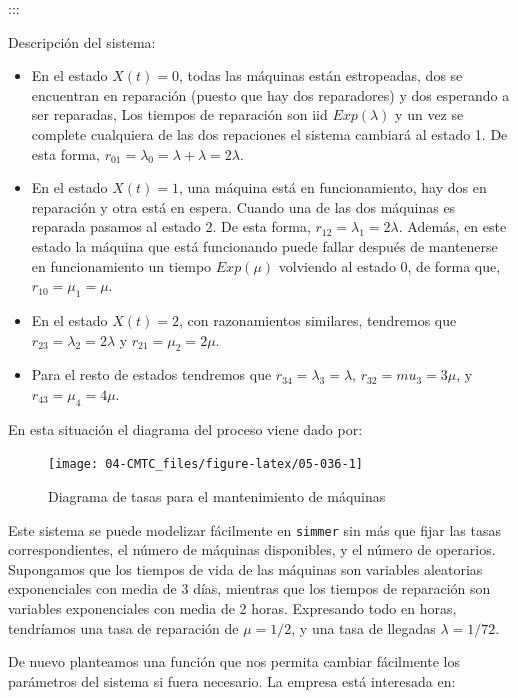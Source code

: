 \documentclass[
]{book}
\theoremstyle{definition}
\theoremstyle{definition}
\theoremstyle{definition}
\theoremstyle{definition}
\theoremstyle{remark}
\begin{document}
:::

Descripción del sistema:

\begin{itemize}
\item
  En el estado \(X(t)=0\), todas las máquinas están estropeadas, dos se encuentran en reparación (puesto que hay dos reparadores) y dos esperando a ser reparadas, Los tiempos de reparación son iid \(Exp(\lambda)\) y un vez se complete cualquiera de las dos repaciones el sistema cambiará al estado 1. De esta forma, \(r_{01} = \lambda_0 = \lambda + \lambda = 2\lambda\).
\item
  En el estado \(X(t)=1\), una máquina está en funcionamiento, hay dos en reparación y otra está en espera. Cuando una de las dos máquinas es reparada pasamos al estado 2. De esta forma, \(r_{12} = \lambda_1 = 2\lambda\). Además, en este estado la máquina que está funcionando puede fallar después de mantenerse en funcionamiento un tiempo \(Exp(\mu)\) volviendo al estado 0, de forma que, \(r_{10} = \mu_1 = \mu\).
\item
  En el estado \(X(t)=2\), con razonamientos similares, tendremos que \(r_{23} = \lambda_2 = 2\lambda\) y \(r_{21} = \mu_2 = 2\mu\).
\item
  Para el resto de estados tendremos que \(r_{34} = \lambda_3 = \lambda\), \(r_{32} = mu_3 = 3\mu\), y \(r_{43} = \mu_4 = 4\mu\).
\end{itemize}

En esta situación el diagrama del proceso viene dado por:

\begin{figure}

{\centering \texttt{[image: 04-CMTC\_files/figure-latex/05-036-1]} 

}

\caption{Diagrama de tasas para el mantenimiento de máquinas}\label{fig:05-036}
\end{figure}

Este sistema se puede modelizar fácilmente en \texttt{simmer} sin más que fijar las tasas correspondientes, el número de máquinas disponibles, y el número de operarios. Supongamos que los tiempos de vida de las máquinas son variables aleatorias exponenciales con media de 3 días, mientras que los tiempos de reparación son variables exponenciales con media de 2 horas. Expresando todo en horas, tendríamos una tasa de reparación de \(\mu = 1/2\), y una tasa de llegadas \(\lambda = 1/72\).

De nuevo planteamos una función que nos permita cambiar fácilmente los parámetros del sistema si fuera necesario. La empresa está interesada en:
\end{document}
